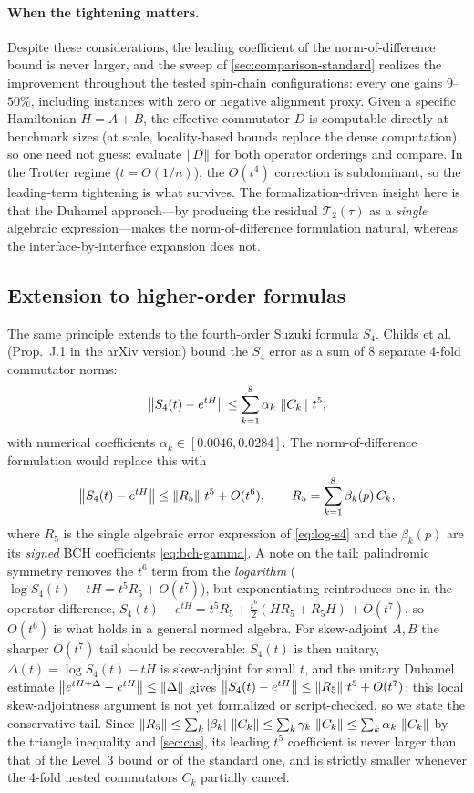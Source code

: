 \paragraph{When the tightening matters.}
Despite these considerations, the leading coefficient of the
norm-of-difference bound is never larger, and the sweep of
\cref{sec:comparison-standard} realizes the improvement throughout the
tested spin-chain configurations: every one gains
$9$--$50\%$, including instances with zero or negative alignment proxy.
Given a specific
Hamiltonian $H = A + B$, the effective commutator $D$ is computable
directly at benchmark sizes (at scale, locality-based bounds replace the
dense computation), so one need not
guess: evaluate $\left\|D\right\|$ for both operator orderings and compare. In the
Trotter regime ($t = O(1/n)$),
the $O(t^4)$ correction is subdominant, so the leading-term tightening
is what survives.
The formalization-driven insight here is that the Duhamel approach---by
producing the residual $\mathcal{T}_2(\tau)$ as a \emph{single}
algebraic expression---makes the norm-of-difference formulation natural,
whereas the interface-by-interface expansion does not.

\subsection{Extension to higher-order formulas}

The same principle extends to the fourth-order Suzuki formula $S_4$.
Childs et al.~\cite{childsTheoryTrotterError2021} (Prop.~J.1 in the arXiv
version) bound
the $S_4$ error as a sum of 8 separate 4-fold commutator norms:
\[
  \left\|S_4(t) - e^{tH}\right\|
    \le \sum_{k=1}^{8} \alpha_k\,\left\|C_k\right\|\,t^5,
\]
with numerical coefficients $\alpha_k \in [0.0046, 0.0284]$.
The norm-of-difference formulation would replace this with
\[
  \left\|S_4(t) - e^{tH}\right\| \le \left\|R_5\right\|\,t^5 + O(t^6),
  \qquad
  R_5 = \sum_{k=1}^{8} \beta_k(p)\,C_k,
\]
where $R_5$ is the single algebraic error expression of \cref{eq:log-s4} and
the $\beta_k(p)$ are its \emph{signed} BCH coefficients \eqref{eq:bch-gamma}.
A note on the tail: palindromic symmetry removes the $t^6$ term from the
\emph{logarithm} ($\log S_4(t) - tH = t^5 R_5 + O(t^7)$), but exponentiating
reintroduces one in the operator difference,
$S_4(t) - e^{tH} = t^5 R_5 + \tfrac{t^6}{2}(H R_5 + R_5 H) + O(t^7)$, so
$O(t^6)$ is what holds in a general normed algebra. For skew-adjoint $A, B$
the sharper $O(t^7)$ tail should be recoverable: $S_4(t)$ is then unitary,
$\Delta(t) = \log S_4(t) - tH$ is skew-adjoint for small $t$, and the
unitary Duhamel estimate $\left\|e^{tH+\Delta} - e^{tH}\right\| \le \left\|\Delta\right\|$
gives $\left\|S_4(t) - e^{tH}\right\| \le \left\|R_5\right\|\,t^5 + O(t^7)$; this local
skew-adjointness argument is not yet formalized or script-checked, so we
state the conservative tail.
Since $\left\|R_5\right\| \le \sum_k \left|\beta_k\right|\,\left\|C_k\right\|
\le \sum_k \gamma_k\,\left\|C_k\right\| \le \sum_k \alpha_k\,\left\|C_k\right\|$
by the triangle inequality and \cref{sec:cas}, its leading $t^5$ coefficient
is never larger than that of the Level~3 bound or of the standard one, and
is strictly smaller whenever the 4-fold nested commutators $C_k$ partially
cancel.

